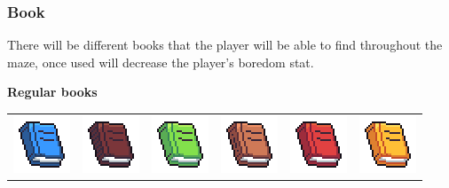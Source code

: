 \documentclass[../Main.tex]{subfiles}
\begin{document}
\begin{center}
\begin{tabular}{ m{} m{} m{} m{} m{} }
                \end{tabular}
            \end{center}
        \subsubsection{Book}
            There will be different books that the player will be able to find throughout the maze, once used will decrease the player's boredom stat.

            \textbf{Regular books}
            \begin{center}
                \begin{tabular}{ m{} m{} m{} m{} m{} m{} }
                    \centerline{\includegraphics{../res/textures/items/potions/books/Blue.png}} & \centerline{\includegraphics{../res/textures/items/potions/books/DarkBrown.png}} & \centerline{\includegraphics{../res/textures/items/potions/books/Green.png}} & \centerline{\includegraphics{../res/textures/items/potions/books/LightBrown.png}} & \centerline{\includegraphics{../res/textures/items/potions/books/Red.png}} & \centerline{\includegraphics{../res/textures/items/potions/books/Yellow.png}}\\
                \end{tabular}
            \end{center}
\end{document}
